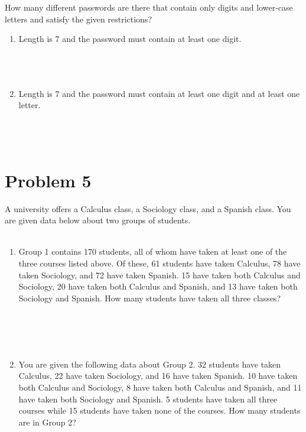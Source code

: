 \documentclass{amsart}
\theoremstyle{definition}
\theoremstyle{Exercise}
\theoremstyle{remark}
\theoremstyle{rule}
\numberwithin{equation}{section}
\begin{document}
How many different passwords are there that contain only digits and lower-case letters and satisfy the given restrictions?\\
      \begin{enumerate}[label=(\roman*), start=3]
    \item Length is 7 and the password must contain at least one digit.\\\\
\\\\
     \item Length is 7 and the password must contain at least one digit and at least one letter.\\\\
\\\\
    \end{enumerate}
 
 \newpage

\section*{Problem 5}

A university offers a Calculus class, a Sociology class, and a Spanish class. You are given data below about two groups of students.\\\\
     \begin{enumerate}[label=(\roman*)]
     \item Group 1 contains 170 students, all of whom have taken at least one of the three courses listed above. Of these, 61 students have taken Calculus, 78 have taken Sociology, and 72 have taken Spanish. 15 have taken both Calculus and Sociology, 20 have taken both Calculus and Spanish, and 13 have taken both Sociology and Spanish. How many students have taken all three classes?\\\\
\\\\\
   
\item You are given the following data about Group 2. 32 students have taken Calculus, 22 have taken Sociology, and 16 have taken Spanish. 10 have taken both Calculus and Sociology, 8 have taken both Calculus and Spanish, and 11 have taken both Sociology and Spanish. 5 students have taken all three courses while 15 students have taken none of the courses. How many students are in Group 2?\\\\
\\\\\
         \end{enumerate}
 \newpage
\end{document}
